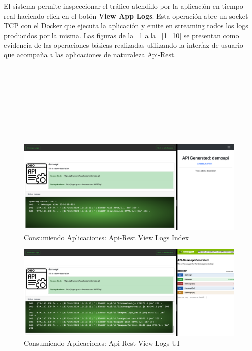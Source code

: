 \documentclass[a4paper,11pt]{book}
\begin{document}
El sistema permite inspeccionar el tráfico atendido por la aplicación en tiempo real haciendo click en el botón \textbf{View App Logs}. Esta operación abre un socket TCP con el Docker que ejecuta la aplicación y emite en streaming todos los logs producidos por la misma. Las  figuras de la ~\ref{1_7} a la ~\ref{1_10}  se presentan  como evidencia de las operaciones básicas realizadas utilizando la interfaz de usuario que acompaña a las aplicaciones de naturaleza Api-Rest. 
~\\
~\\
~\\
~\\
~\\
~\\
~\\
~\\
~\\
\begin{figure}[H]
\centering
\includegraphics[scale=0.25]{imagenes/casouso_a/1_7.png}
\caption{  Consumiendo Aplicaciones: Api-Rest View Logs Index}
\label{1_7}
\end{figure}


\begin{figure}[H]
\centering
\includegraphics[scale=0.25]{imagenes/casouso_a/1_8.png}
\caption{  Consumiendo Aplicaciones: Api-Rest View Logs UI}
\label{1_8}
\end{figure}
\end{document}
